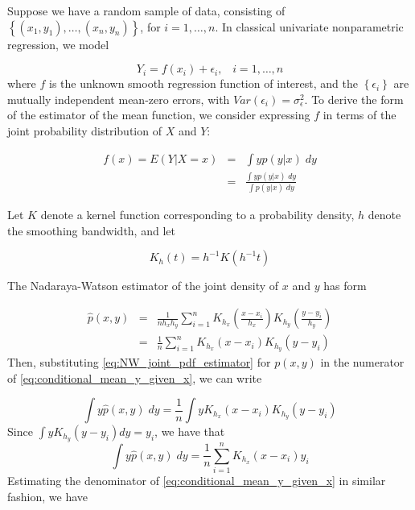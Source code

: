 \documentclass[12pt]{article}
\begin{document}
Suppose we have a random sample of data, consisting of $\left\{ \left(x_1, y_1\right),\dots, \left(x_n, y_n\right)\right\}$, for $i=1,\dots,n$. In classical univariate nonparametric regression, we model 

\begin{equation}
Y_i = f\left(x_i\right) + \epsilon_i,\;\;\;i=1,\dots, n \label{eq:classical_NP_regression_model}
\end{equation} 
\noindent
where $f$ is the unknown smooth regression function of interest, and the $\left\{ \epsilon_i \right\}$ are mutually independent mean-zero errors, with $Var\left(\epsilon_i\right)=\sigma_\epsilon^2$. To derive the form of the estimator of the mean function, we consider expressing $f$ in terms of the joint probability distribution of $X$ and $Y$:

\begin{eqnarray} 
f\left(x\right) = E\left(Y \vert X=x\right) &=& \int yp(y \vert x)\;dy \nonumber \\
&=& \frac{ \int yp(y \vert x)\;dy }{ \int p(y \vert x)\;dy } \label{eq:conditional_mean_y_given_x}
\end{eqnarray}
 
Let $K$ denote a kernel function corresponding to a probability density, $h$ denote the smoothing bandwidth, and let 

\[
K_h\left(t\right) = h^{-1} K\left(h^{-1} t \right)
\] 

The Nadaraya-Watson estimator of the joint density of $x$ and $y$ has form

\begin{eqnarray} 
\hat{p}\left(x,y\right) &=& \frac{1}{nh_x h_y}\sum_{i=1}^{n} K_{h_x}\left(\frac{x-x_i}{h_x}\right) K_{h_y}\left(\frac{y-y_i}{h_y}\right)  \nonumber \\ 
&=& \frac{1}{n}\sum_{i=1}^{n} K_{h_x}\left(x-x_i\right) K_{h_y}\left(y-y_i\right) \label{eq:NW_joint_pdf_estimator} 
\end{eqnarray}
\noindent
Then, substituting \ref{eq:NW_joint_pdf_estimator} for $p\left(x,y\right)$ in the numerator of \ref{eq:conditional_mean_y_given_x}, we can write 

\begin{equation} \nonumber 
\int y \hat{p}\left(x,y\right)\;dy = \frac{1}{n} \int y K_{h_x}\left(x-x_i\right) K_{h_y}\left(y-y_i\right)
\end{equation} 
\noindent
Since $\int yK_{h_y}\left(y-y_i\right)dy = y_i$, we have that 
\begin{equation} \label{eq:num_est}
\int y \hat{p}\left(x,y\right)\;dy = \frac{1}{n}\sum_{i=1}^n K_{h_x}\left(x-x_i\right) y_i 
\end{equation} 
\noindent
Estimating the denominator of \ref{eq:conditional_mean_y_given_x} in similar fashion, we have 
\end{document}
